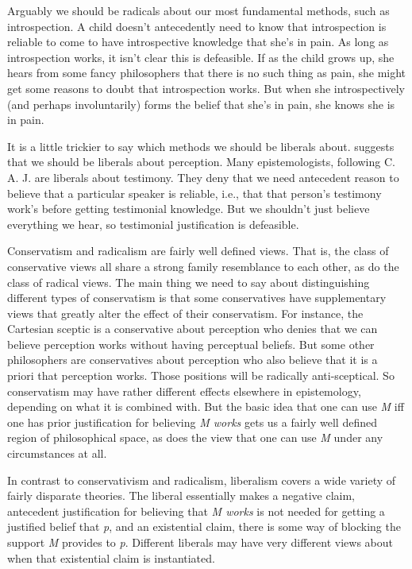 Arguably we should be radicals about our most fundamental methods, such as introspection. A child doesn't antecedently need to know that introspection is reliable to come to have introspective knowledge that she's in pain. As long as introspection works, it isn't clear this is defeasible. If as the child grows up, she hears from some fancy philosophers that there is no such thing as pain, she might get some reasons to doubt that introspection works. But when she introspectively (and perhaps involuntarily) forms the belief that she's in pain, she knows she is in pain.

It is a little trickier to say which methods we should be liberals about. \citet{Pryor2000} suggests that we should be liberals about perception. Many epistemologists, following C. A. J. \citet{Coady1995} are liberals about testimony. They deny that we need antecedent reason to believe that a particular speaker is reliable, i.e., that that person's testimony work's before getting testimonial knowledge. But we shouldn't just believe everything we hear, so testimonial justification is defeasible.

Conservatism and radicalism are fairly well defined views. That is, the class of conservative views all share a strong family resemblance to each other, as do the class of radical views. The main thing we need to say about distinguishing different types of conservatism is that some conservatives have supplementary views that greatly alter the effect of their conservatism. For instance, the Cartesian sceptic is a conservative about perception who denies that we can believe perception works without having perceptual beliefs. But some other philosophers are conservatives about perception who also believe that it is a priori that perception works. Those positions will be radically anti-sceptical. So conservatism may have rather different effects elsewhere in epistemology, depending on what it is combined with. But the basic idea that one can use \emph{M} iff one has prior justification for believing \emph{M works} gets us a fairly well defined region of philosophical space, as does the view that one can use \emph{M} under any circumstances at all.

In contrast to conservativism and radicalism, liberalism covers a wide variety of fairly disparate theories. The liberal essentially makes a negative claim, antecedent justification for believing that \emph{M works} is not needed for getting a justified belief that \emph{p}, and an existential claim, there is some way of blocking the support \emph{M} provides to \emph{p}. Different liberals may have very different views about when that existential claim is instantiated.

